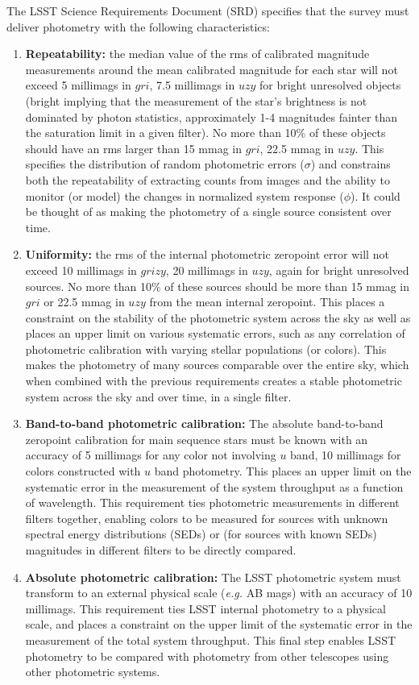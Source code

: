 \documentclass[12pt,preprint]{aastex}
\begin{document}
The LSST Science Requirements Document (SRD) specifies that the survey
must deliver photometry with the following characteristics: 
\begin{enumerate}
\item{{\bf Repeatability:} the median value of the rms of calibrated magnitude
measurements around the mean calibrated magnitude for each
star will not exceed 5 millimags in $gri$, 7.5 millimags in $uzy$
for bright unresolved objects (bright implying that the measurement
of the star's brightness is not dominated by photon statistics,
approximately 1-4 magnitudes fainter than the saturation limit in a
given filter).  No more than 10\% of these objects should have an rms larger
than 15 mmag in $gri$, 22.5 mmag in $uzy$.  This specifies the
distribution of random photometric errors ($\sigma$) and constrains
both the repeatability of extracting counts from images and the
ability to monitor (or model) the changes in normalized system
response ($\phi$). It could be thought of as making the photometry of
a single source consistent over time. \label{repeatability_req}}
\item{{\bf Uniformity:} the rms of the internal photometric zeropoint
error will not exceed 10 millimags in $grizy$, 20 millimags in $uzy$,
again for bright unresolved sources. No more than 10\% of these
sources should be more than 15 mmag in $gri$ or 22.5 mmag in $uzy$
from the mean internal zeropoint.  This places a constraint on the
stability of the photometric system across the sky as well as places
an upper limit on various systematic errors, such as any correlation
of photometric calibration with varying stellar populations (or
colors). This makes the photometry of many sources comparable over the
entire sky, which when combined with the previous requirements creates
a stable photometric system across the sky and over time, in a single
filter. \label{uniformity_req}}
\item{{\bf Band-to-band photometric calibration:} The absolute
band-to-band zeropoint calibration for main sequence stars must be
known with an accuracy of 5 millimags for any color not involving $u$
band, 10 millimags for colors constructed with $u$ band
photometry. This places an upper limit on the systematic error in
the measurement of the system throughput as a function of
wavelength. This requirement ties photometric measurements in
different filters together, enabling colors to be measured for sources
with unknown spectral energy distributions (SEDs) or (for sources with known SEDs) magnitudes in
different filters to be directly compared. \label{color_req}}
\item{{\bf Absolute photometric calibration:} The LSST photometric
system must transform to an external physical scale ({\it e.g.} AB
mags) with an accuracy of 10 millimags. This requirement ties LSST
internal photometry to a physical scale, and places a constraint on
the upper limit of the systematic error in the measurement of the
total system throughput. This final step enables LSST photometry to be
compared with photometry from other telescopes using other photometric
systems. \label{abs_req}}
\end{enumerate}
\end{document}
